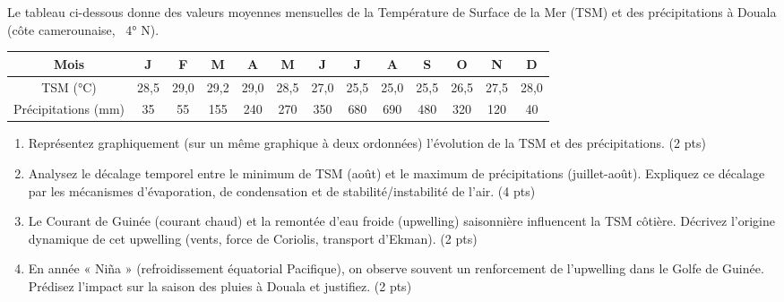 \documentclass[11pt]{article}
\begin{document}
\begin{exercice}
\label{exo:courant_guinee}
Le tableau ci-dessous donne des valeurs moyennes mensuelles de la Température de Surface de la Mer (TSM) et des précipitations à Douala (côte camerounaise, ~4° N).

\begin{center}
\begin{tabular}{|c|c|c|c|c|c|c|c|c|c|c|c|c|}
\hline
Mois & J & F & M & A & M & J & J & A & S & O & N & D \\
\hline
TSM (\si{\degreeCelsius}) & 28,5 & 29,0 & 29,2 & 29,0 & 28,5 & 27,0 & 25,5 & 25,0 & 25,5 & 26,5 & 27,5 & 28,0 \\
\hline
Précipitations (mm) & 35 & 55 & 155 & 240 & 270 & 350 & 680 & 690 & 480 & 320 & 120 & 40 \\
\hline
\end{tabular}
\end{center}

\begin{enumerate}
    \item Représentez graphiquement (sur un même graphique à deux ordonnées) l'évolution de la TSM et des précipitations. \hfill (2 pts)
    \item Analysez le décalage temporel entre le minimum de TSM (août) et le maximum de précipitations (juillet-août). Expliquez ce décalage par les mécanismes d'évaporation, de condensation et de stabilité/instabilité de l'air. \hfill (4 pts)
    \item Le Courant de Guinée (courant chaud) et la remontée d'eau froide (upwelling) saisonnière influencent la TSM côtière. Décrivez l'origine dynamique de cet upwelling (vents, force de Coriolis, transport d'Ekman). \hfill (2 pts)
    \item En année « Niña » (refroidissement équatorial Pacifique), on observe souvent un renforcement de l'upwelling dans le Golfe de Guinée. Prédisez l'impact sur la saison des pluies à Douala et justifiez. \hfill (2 pts)
\end{enumerate}
\end{exercice}
\end{document}
